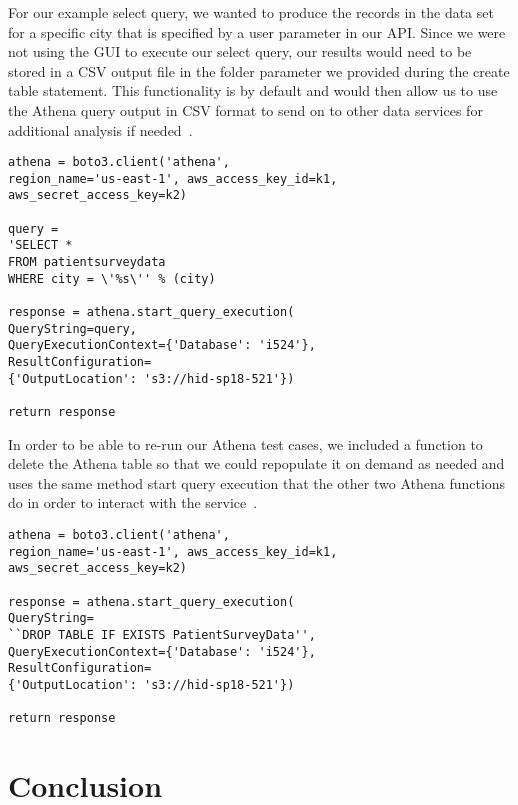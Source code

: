 For our example select query, we wanted to produce the records in the data set 
for a specific city that is specified by a user parameter in our API. Since 
we were not using the GUI to execute our select query, our results would need 
to be stored in a CSV output file in the folder parameter we provided during 
the create table statement. This functionality is by default and would then 
allow us to use the Athena query output in CSV format to send on to other data 
services for additional analysis if needed~\cite{hid-sp18-521-boto-athena}.  

\begin{verbatim}
athena = boto3.client('athena', 
region_name='us-east-1', aws_access_key_id=k1,
aws_secret_access_key=k2)

query = 
'SELECT * 
FROM patientsurveydata 
WHERE city = \'%s\'' % (city)

response = athena.start_query_execution(
QueryString=query,
QueryExecutionContext={'Database': 'i524'}, 
ResultConfiguration=
{'OutputLocation': 's3://hid-sp18-521'})

return response
\end{verbatim}

In order to be able to re-run our Athena test cases, we included a function 
to delete the Athena table so that we could repopulate it on demand as needed 
and uses the same method start query execution that the other two Athena 
functions do in order to interact with the 
service~\cite{hid-sp18-521-boto-athena}. 

\begin{verbatim}
athena = boto3.client('athena', 
region_name='us-east-1', aws_access_key_id=k1,
aws_secret_access_key=k2)

response = athena.start_query_execution(
QueryString=
``DROP TABLE IF EXISTS PatientSurveyData'',
QueryExecutionContext={'Database': 'i524'}, 
ResultConfiguration=
{'OutputLocation': 's3://hid-sp18-521'})

return response
\end{verbatim}

\section{Conclusion}

